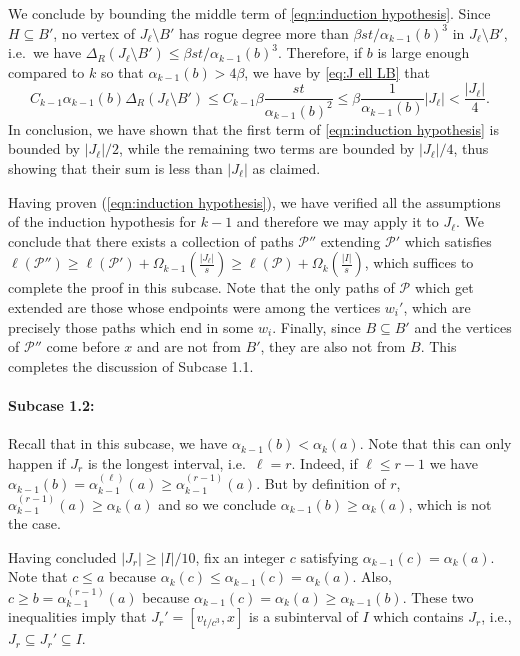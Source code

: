 \documentclass[a4paper,11pt]{article}
\makeatletter
\renewenvironment{proof}[1][\proofname] {\par\pushQED{\qed}\normalfont\topsep6\p@\@plus6\p@\relax\trivlist\item[\hskip\labelsep\bfseries#1\@addpunct{.}]\ignorespaces}{\popQED\endtrivlist\@endpefalse}
\theoremstyle{definition}
\def\cP{\mathcal{P}}
\makeatother
\begin{document}
\begin{proof}
\begin{proof}
We conclude by bounding the middle term of \eqref{eqn:induction hypothesis}. Since $H\subseteq B'$, no vertex of $J_\ell\setminus B'$ has rogue degree more than $\beta st/\alpha_{k-1}(b)^3$ in $J_\ell\setminus B'$, i.e.\ we have
$\Delta_R(J_\ell\setminus B')\leq \beta st/\alpha_{k-1}(b)^3$. Therefore, if $b$ is large enough compared to $k$ so that $\alpha_{k-1}(b)> 4\beta$, we have by \eqref{eq:J ell LB} that
\[C_{k-1}\alpha_{k-1}(b)\Delta_R(J_\ell\setminus B')\leq C_{k-1}\beta \frac{st}{\alpha_{k-1}(b)^2}\leq \beta\frac{1}{\alpha_{k-1}(b)}|J_\ell|< \frac{|J_\ell|}{4}.\]
In conclusion, we have shown that the first term of \eqref{eqn:induction hypothesis} is bounded by $|J_\ell|/2$, while the remaining two terms are bounded by $|J_\ell|/4$, thus showing that their sum is less than $|J_\ell|$ as claimed.
\end{proof}


Having proven (\ref{eqn:induction hypothesis}), we have verified all the assumptions of the induction hypothesis for $k-1$ and therefore we may apply it to $J_\ell$. We conclude that there exists a collection of paths $\cP''$ extending $\cP'$ which satisfies $\ell(\cP'')\geq \ell(\cP')+\Omega_{k-1}(\frac{|J_\ell|}{s})\geq \ell(\cP)+\Omega_k(\frac{|I|}{s})$, which suffices to complete the proof in this subcase. Note that the only paths of $\cP$ which get extended are those whose endpoints were among the vertices $w_i'$, which are precisely those paths which end in some $w_i$. 
Finally, since $B\subseteq B'$ and the vertices of $\cP''$ come before $x$ and are not from $B'$, they are also not from $B$. This completes the discussion of Subcase 1.1.

\paragraph{Subcase 1.2:}
Recall that in this subcase, we have $\alpha_{k-1}(b)<\alpha_k(a)$. Note that this can only happen if $J_r$ is the longest interval, i.e.\ $\ell=r$. Indeed, if $\ell \leq r-1$ we have $\alpha_{k-1}(b)=\alpha_{k-1}^{(\ell)}(a)\geq \alpha_{k-1}^{(r-1)}(a)$. But by definition of $r$, $\alpha_{k-1}^{(r-1)}(a)\geq \alpha_k(a)$ and so we conclude $\alpha_{k-1}(b)\geq \alpha_k(a)$, which is not the case.

Having concluded $|J_r|\geq |I|/10$, fix an integer $c$ satisfying $\alpha_{k-1}(c)=\alpha_k(a)$.
Note that $c \leq a$ because $\alpha_k(c) \leq \alpha_{k-1}(c) = \alpha_k(a)$. Also, $c \geq b = \alpha_{k-1}^{(r-1)}(a)$ because $\alpha_{k-1}(c) = \alpha_k(a) \geq \alpha_{k-1}(b)$.
These two inequalities imply that $J_r'=[v_{t/c^3}, x]$ is a subinterval of $I$ which contains $J_r$, i.e., $J_r\subseteq J_r'\subseteq I$.


\end{proof}
\end{document}
